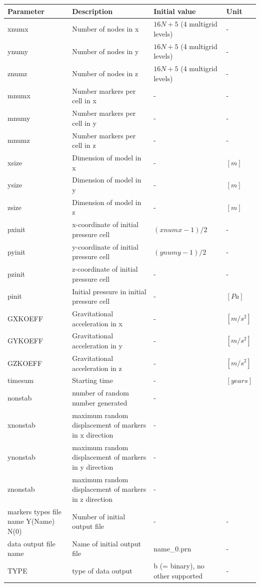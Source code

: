 \begin{table}[H]
\begin{table}[H]
\small
\centering
\begin{tabular}{p{3cm} p{6cm} p{3cm} l}
\toprule
Parameter & Description & Initial value & Unit\\
\midrule
xnumx & Number of nodes in x & $16N+5$ (4 multigrid levels) & - \\
ynumy & Number of nodes in y & $16N+5$ (4 multigrid levels) & - \\
znumz & Number of nodes in z & $16N+5$ (4 multigrid levels) & - \\
mnumx & Number markers per cell in x & - & - \\
mnumy & Number markers per cell in y & - & - \\
mnumz & Number markers per cell in z & - & - \\
xsize & Dimension of model in x & - & $[m]$ \\
ysize & Dimension of model in y & - & $[m]$ \\
zsize & Dimension of model in z & - & $[m]$ \\
pxinit & x-coordinate of initial pressure cell & $(xnumx-1)/2$ & - \\
pyinit & y-coordinate of initial pressure cell & $(ynumy-1)/2$ & - \\
pzinit & z-coordinate of initial pressure cell & - & - \\
pinit & Initial pressure in initial pressure cell & - & $[Pa]$ \\
GXKOEFF & Gravitational acceleration in x & - & $[m/s^2]$ \\
GYKOEFF & Gravitational acceleration in y & - & $[m/s^2]$ \\
GZKOEFF & Gravitational acceleration in z & - & $[m/s^2]$ \\
timesum & Starting time & - & $[years]$ \\
nonstab & number of random number generated & - &  \\
xnonstab & maximum random displacement of markers in x direction & - &  \\
ynonstab & maximum random displacement of markers in y direction & - &  \\
znonstab & maximum random displacement of markers in z direction & - &  \\
\footnotesize{markers types file name Y(Name) N(0)} & Number of initial output file & - & - \\
\footnotesize{data output file name} & Name of initial output file & name\_0.prn & - \\
TYPE	& type of data output & b (= binary), no other supported & - \\


\end{tabular}
\end{table}
\end{table}
